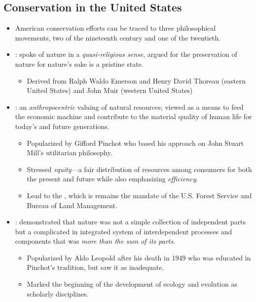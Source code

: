 \documentclass{inVerba-notes}
\begin{document}
\begin{itemize}
    \subsection{Conservation in the United States}\label{Conservation in the United States}
    \begin{itemize}
        \item American conservation efforts can be traced to three
        philosophical movements, two of the nineteenth century
        and one of the twentieth.
        \item {}: spoke of nature in a \emph{quasi-religious sense}, argued for the preservation of nature for nature’s sake is a pristine state.
        \begin{itemize}
            \item Derived from Ralph Waldo Emerson and Henry David Thoreau (eastern United States) and John Muir (western United States)
        \end{itemize}
        \item {}: an \emph{anthropocentric} valuing of natural resources; viewed as a means to feed the economic machine and contribute to the material quality of human life for today’s and future generations.
        \begin{itemize}
            \item Popularized by Gifford Pinchot who based his approach on John Stuart Mill's utilitarian philosophy.
            \item Stressed \emph{equity}---a fair distribution of resources among consumers for both the present and future while also emphasizing \emph{efficiency}.
            \item Lead to the , which is remains the mandate of the U.S. Forest Service and Bureau of Land Management.
        \end{itemize}
        \item {}: demonstrated that nature was not a simple collection of independent parts but a complicated in integrated system of interdependent processes and components that was \emph{more than the sum of its parts}.
        \begin{itemize}
            \item Popularized by Aldo Leopold after his death in 1949 who was educated in Pinchot's tradition, but saw it as inadequate.
            \item Marked the beginning of the development of ecology and evolution as scholarly disciplines.
        \end{itemize}
    \end{itemize}
    

\end{itemize}
\end{document}
